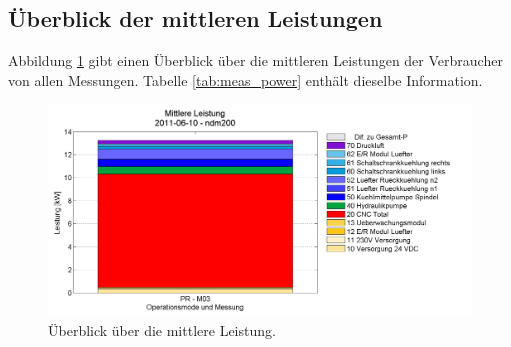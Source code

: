 \documentclass[a4paper,11pt,pdftex,twoside]{scrartcl}
\begin{document}
\subsection{\"Uberblick der mittleren Leistungen}

Abbildung \ref{fig:meas_overview} gibt einen \"Uberblick \"uber die mittleren
Leistungen der Verbraucher von allen Messungen. Tabelle \ref{tab:meas_power}
enth\"alt dieselbe Information.

\begin{figure}[H]
\begin{center}
  \includegraphics[width=\columnwidth]{figures/2011-06-10_ndm200_M031_cbar.png}
  \caption{\"Uberblick \"uber die mittlere Leistung.}
  \label{fig:meas_overview}
\end{center}
\end{figure}




\end{document}
